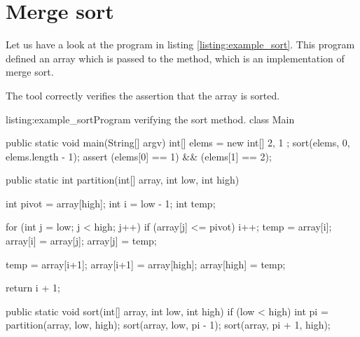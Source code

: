 \section{Merge sort}
Let us have a look at the program in listing \ref{listing:example_sort}. This 
program defined an array  which is passed to the 
method, which is an implementation of merge sort.

The tool correctly verifies the assertion that the array is sorted.

\begin{Java}{listing:example_sort}{Program verifying the sort method.}
class Main {
    public static void main(String[] argv) {
        int[] elems = new int[] { 2, 1 };
        sort(elems, 0, elems.length - 1);
        assert (elems[0] == 1) && (elems[1] == 2);
    }

    public static int partition(int[] array, int low, int high)
    {
        int pivot = array[high];
        int i = low - 1;
        int temp;

        for (int j = low; j < high; j++) {
            if (array[j] <= pivot)
            {
                i++;
                temp = array[i];
                array[i] = array[j];
                array[j] = temp;
            }
        }

        temp = array[i+1];
        array[i+1] = array[high];
        array[high] = temp;

        return i + 1;
    }

    public static void sort(int[] array, int low, int high) {
        if (low < high) {
            int pi = partition(array, low, high);
            sort(array, low, pi - 1);
            sort(array, pi + 1, high);
        }
    }
}
\end{Java}